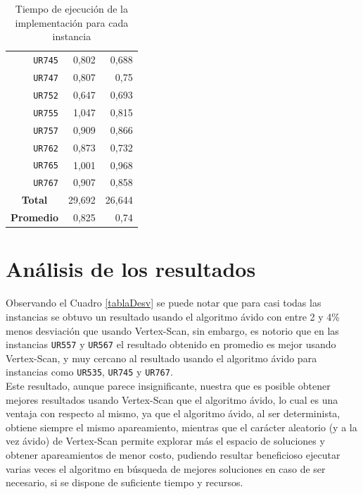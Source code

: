 \documentclass[11pt]{article}
\begin{document}
\begin{table}[htbp]
\begin{center}
\begin{tabular}{|r|r|r|}
   \texttt{UR745} & 0,802 & 0,688 \\
   \texttt{UR747} & 0,807 & 0,75 \\
   \texttt{UR752} & 0,647 & 0,693 \\
   \texttt{UR755} & 1,047 & 0,815 \\
   \texttt{UR757} & 0,909 & 0,866 \\
   \texttt{UR762} & 0,873 & 0,732 \\
   \texttt{UR765} & 1,001 & 0,968 \\
   \texttt{UR767} & 0,907 & 0,858 \\ \hline
   \multicolumn{1}{|c|}{\textbf{Total}} & 29,692 & 26,644 \\ \hline
   \multicolumn{1}{|c|}{\textbf{Promedio}} & 0,825 & 0,74 \\ \hline
   \end{tabular}
   \end{center}
   \caption{Tiempo de ejecución de la implementación para cada instancia}
   \label{tablaTiempos}
\end{table}

\section{Análisis de los resultados}

Observando el Cuadro \ref{tablaDesv} se puede notar que para 
casi todas las instancias se obtuvo un resultado usando
el algoritmo ávido con entre 2 y 4\% menos desviación que
usando Vertex-Scan, sin embargo, es notorio que en las instancias
\texttt{UR557} y \texttt{UR567} el resultado obtenido en promedio
es mejor usando Vertex-Scan, y muy cercano al resultado usando 
el algoritmo ávido para instancias como \texttt{UR535},
\texttt{UR745} y \texttt{UR767}. \\

Este resultado, aunque parece insignificante, nuestra que es
posible obtener mejores resultados usando Vertex-Scan que el 
algoritmo ávido, lo cual es una ventaja con respecto al mismo,
ya que el algoritmo ávido, al ser determinista, obtiene siempre
el mismo apareamiento, mientras que el carácter aleatorio (y
a la vez ávido) de Vertex-Scan permite explorar más el espacio
de soluciones y obtener apareamientos de menor costo, pudiendo
resultar beneficioso ejecutar varias veces el algoritmo en búsqueda
de mejores soluciones en caso de ser necesario, si se dispone
de suficiente tiempo y recursos. \\
\end{document}
